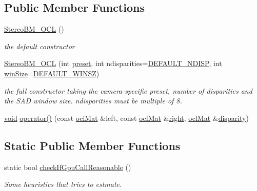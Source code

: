 \subsection*{Public Member Functions}
\begin{DoxyCompactItemize}
\item 
\hyperlink{classcv_1_1ocl_1_1StereoBM__OCL_a774b163cf0456639934f0ceec2977b0b}{Stereo\-B\-M\-\_\-\-O\-C\-L} ()
\begin{DoxyCompactList}\small\item\em the default constructor \end{DoxyCompactList}\item 
\hyperlink{classcv_1_1ocl_1_1StereoBM__OCL_a12df3c99ff5b35d8fc67c0b70837835a}{Stereo\-B\-M\-\_\-\-O\-C\-L} (int \hyperlink{classcv_1_1ocl_1_1StereoBM__OCL_acef365d858035ce0a04717c7d2702a53}{preset}, int ndisparities=\hyperlink{classcv_1_1ocl_1_1StereoBM__OCL_abe855c11c6bac7c5e3fa664261c415aba2dab5b11e06fea1dfb21c9f0fe20d775}{D\-E\-F\-A\-U\-L\-T\-\_\-\-N\-D\-I\-S\-P}, int \hyperlink{classcv_1_1ocl_1_1StereoBM__OCL_a3041e91028d459e913db11557cff9800}{win\-Size}=\hyperlink{classcv_1_1ocl_1_1StereoBM__OCL_abe855c11c6bac7c5e3fa664261c415aba83dcbfb5f4b5682a59050ee1bf2d144a}{D\-E\-F\-A\-U\-L\-T\-\_\-\-W\-I\-N\-S\-Z})
\begin{DoxyCompactList}\small\item\em the full constructor taking the camera-\/specific preset, number of disparities and the S\-A\-D window size. ndisparities must be multiple of 8. \end{DoxyCompactList}\item 
\hyperlink{legacy_8hpp_a8bb47f092d473522721002c86c13b94e}{void} \hyperlink{classcv_1_1ocl_1_1StereoBM__OCL_a45305597efda55e0c0acdb822f835192}{operator()} (const \hyperlink{classcv_1_1ocl_1_1oclMat}{ocl\-Mat} \&left, const \hyperlink{classcv_1_1ocl_1_1oclMat}{ocl\-Mat} \&\hyperlink{legacy_8hpp_a6b04b878081bf724144b73c75dfd1894}{right}, \hyperlink{classcv_1_1ocl_1_1oclMat}{ocl\-Mat} \&\hyperlink{calib3d_8hpp_acd2ef073a3a4984e0a0ebac5c7e179fd}{disparity})
\end{DoxyCompactItemize}
\subsection*{Static Public Member Functions}
\begin{DoxyCompactItemize}
\item 
static bool \hyperlink{classcv_1_1ocl_1_1StereoBM__OCL_aa523805f7cdb99c599767b8550eb99d9}{check\-If\-Gpu\-Call\-Reasonable} ()
\begin{DoxyCompactList}\small\item\em Some heuristics that tries to estmate. \end{DoxyCompactList}\end{DoxyCompactItemize}
